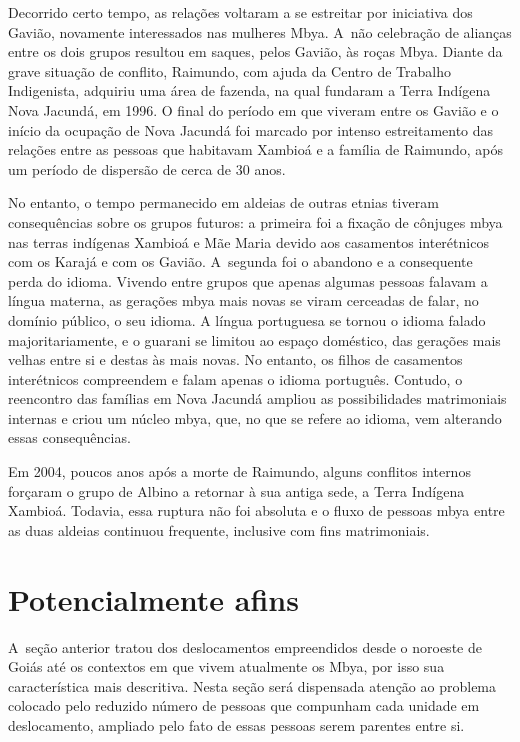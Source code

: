 Decorrido certo tempo, as relações voltaram a se estreitar por
iniciativa dos Gavião, novamente interessados nas mulheres Mbya. A~não
celebração de alianças entre os dois grupos resultou em saques, pelos
Gavião, às roças Mbya. Diante da grave situação de conflito, Raimundo,
com ajuda da  Centro de Trabalho Indigenista, adquiriu uma área de
fazenda, na qual fundaram a Terra Indígena Nova Jacundá, em 1996. O
final do período em que viveram entre os Gavião e o início da ocupação
de Nova Jacundá foi marcado por intenso estreitamento das relações
entre as pessoas que habitavam Xambioá e a família de Raimundo, após um
período de dispersão de cerca de 30 anos.

No entanto, o tempo permanecido em aldeias de outras etnias tiveram
consequências sobre os grupos futuros: a primeira foi a fixação de
cônjuges mbya nas terras indígenas Xambioá e Mãe Maria devido aos
casamentos interétnicos com os Karajá e com os Gavião. A~segunda foi o
abandono e a consequente perda do idioma. Vivendo entre grupos que
apenas algumas pessoas falavam a língua materna, as gerações mbya mais
novas se viram cerceadas de falar, no domínio público, o seu idioma. A
língua portuguesa se tornou o idioma falado majoritariamente, e o
guarani se limitou ao espaço doméstico, das gerações mais velhas entre
si e destas às mais novas. No entanto, os filhos de casamentos
interétnicos compreendem e falam apenas o idioma português. Contudo, o
reencontro das famílias em Nova Jacundá ampliou as possibilidades
matrimoniais internas e criou um núcleo mbya, que, no que se refere ao
idioma, vem alterando essas consequências.

Em 2004, poucos anos após a morte de Raimundo, alguns conflitos internos
forçaram o grupo de Albino a retornar à sua antiga sede, a Terra
Indígena Xambioá. Todavia, essa ruptura não foi absoluta e o fluxo de
pessoas mbya entre as duas aldeias continuou frequente, inclusive com
fins matrimoniais.

\section{Potencialmente afins}

A~seção anterior tratou dos deslocamentos empreendidos desde o noroeste
de Goiás até os contextos em que vivem atualmente os Mbya, por isso sua
característica mais descritiva. Nesta seção será dispensada atenção ao
problema colocado pelo reduzido número de pessoas que compunham cada
unidade em deslocamento, ampliado pelo fato de essas pessoas serem
parentes entre si.

